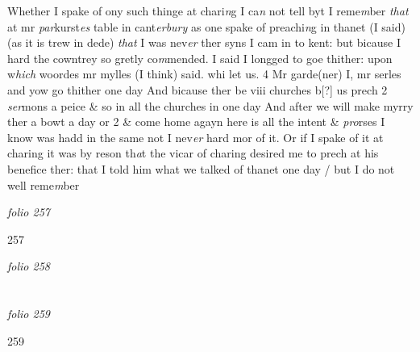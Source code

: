 \documentclass[12pt, a4paper]{book}
\begin{document}
				\marginpar[\vspace{0.5cm}{\textcolor{Gray}{n}}]{}
			

		\ifthenelse{\isodd{\thepage}}
		{\reversemarginpar}
		{\normalmarginpar}
		Whether I spake of ony such thinge at chari\textit{n}g I ca\textit{n}
               not 
			tell byt I reme\textit{m}ber \textit{that}
 at mr \textit{par}kurst\textit{es} table in cant\textit{erbury} as one spake of preachi\textit{n}g in thanet (I said) 
(as it is trew in dede) \textit{that} I was nev\textit{er} ther syns I cam in to kent: but 
bicause I hard the cowntrey so gretly co\textit{m}mended. I said I longged to goe
thither: upon w\textit{hich} woordes mr mylles (I think) said. whi let us. 4 Mr garde(ner)
I, mr serles and yow go thither one day And bicause ther be viii churches b[?]
us prech 2 \textit{ser}mons a peice \& so in all the churches in one day And after
we will make myrry ther a bowt a day or 2 \& come home agayn
here is all the intent \& \textit{pro}rses I know was hadd in the same not I nev\textit{er}
hard mor of it. Or if I spake of it at charing it was by reson th\textit{a}t the 
vicar of charing desired me to prech at his benefice ther: that I told
him what we talked of thanet one day / but I do not well reme\textit{m}ber

\dotfill
						\newpage
{}

\textit{folio 257}


\begin{flushright}{\color{Mahogany}257}\end{flushright}


\dotfill
						\newpage
{}

\textit{folio 258}


         \vspace*{4cm}
         
\dotfill
						  \section*{}  \subsection*{}

\textit{folio 259}



            		\begin{flushright}{\color{Mahogany}259}\end{flushright}
\end{document}
